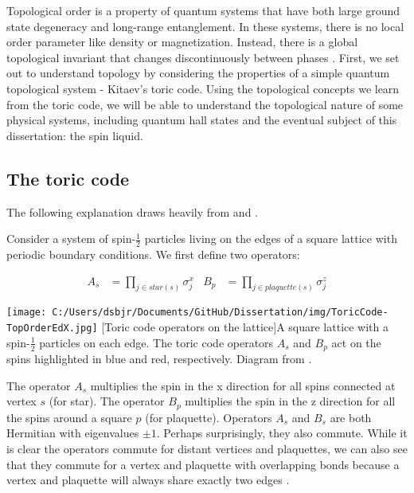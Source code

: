Topological order is a property of quantum systems that have both large ground state degeneracy and long-range entanglement. In these systems, there is no local order parameter like density or magnetization. Instead, there is a global topological invariant that changes discontinuously between phases \cite{Wen2017}. First, we set out to understand topology by considering the properties of a simple quantum topological system - Kitaev's toric code. Using the topological concepts we learn from the toric code, we will be able to understand the topological nature of some physical systems, including quantum hall states and the eventual subject of this dissertation: the spin liquid.

\subsection{The toric code}

The following explanation draws heavily from \cite{Kitaev2003} and \cite{topOrderEdX}.

Consider a system of spin-$\frac{1}{2}$ particles living on the edges of a square lattice with periodic boundary conditions. We first define two operators:

\begin{align*}
A_s&=\prod_{j \in star(s)} \sigma^{x}_{j} 		& B_{p}&=\prod_{j \in plaquette(s)} \sigma^{z}_{j}
\end{align*}

\begin{centering}
\texttt{[image: C:/Users/dsbjr/Documents/GitHub/Dissertation/img/ToricCode-TopOrderEdX.jpg]}
  \captionsetup{width=0.9\textwidth}
  [Toric code operators on the lattice]{A square lattice with a spin-$\frac{1}{2}$ particles on each edge. The toric code operators $A_{s}$ and $B_{p}$ act on the spins highlighted in blue and red, respectively. Diagram from \cite{topOrderEdX}.}
  \label{fig:toricCode1}
\end{centering}

The operator $A_{s}$ multiplies the spin in the x direction for all spins connected at vertex $s$ (for star). The operator $B_{p}$ multiplies the spin in the z direction for all the spins around a square $p$ (for plaquette). Operators $A_{s}$ and $B_{s}$ are both Hermitian with eigenvalues $\pm 1$. Perhaps surprisingly, they also commute. While it is clear the operators commute for distant vertices and plaquettes, we can also see that they commute for a vertex and plaquette with overlapping bonds because a vertex and plaquette will always share exactly two edges \cite{Kitaev2003}.

